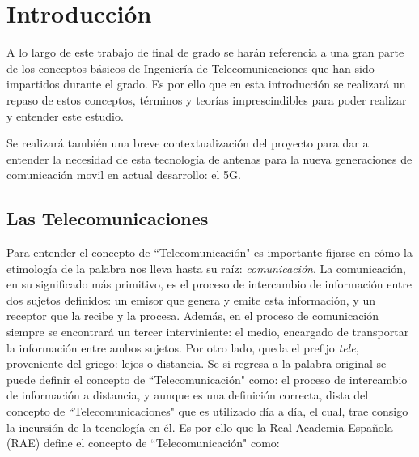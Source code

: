 
\chapter{Introducción}
\label{cap1}
\par A lo largo de este trabajo de final de grado se harán referencia a una gran parte de los conceptos básicos de Ingeniería de Telecomunicaciones que han sido impartidos durante el grado. Es por ello que en esta introducción se realizará un repaso de estos conceptos, términos y teorías imprescindibles para poder realizar y entender este estudio.
\\
\par Se realizará también una breve contextualización del proyecto para dar a entender la necesidad de esta tecnología de antenas para la nueva generaciones de comunicación movil en actual desarrollo: el 5G. 

\section{Las Telecomunicaciones}

\par Para entender el concepto de ``Telecomunicación" es importante fijarse en cómo la etimología de la palabra nos lleva hasta su raíz: \textit{comunicación}. La comunicación, en su significado más primitivo, es el proceso de intercambio de información entre dos sujetos definidos: un emisor que genera y emite esta información, y un receptor que la recibe y la procesa. Además, en el proceso de comunicación siempre se encontrará un tercer interviniente: el medio, encargado de transportar la información entre ambos sujetos. Por otro lado, queda el prefijo \textit{tele}, proveniente del griego: lejos o distancia. Se si regresa a la palabra original se puede definir el concepto de ``Telecomunicación" como: el proceso de intercambio de información a distancia, y aunque es una definición correcta, dista del concepto de ``Telecomunicaciones" que es utilizado día a día, el cual, trae consigo la incursión de la tecnología en él. Es por ello que la Real Academia Española (RAE) define el concepto de ``Telecomunicación" como: \cite{telecomunicacion2019}


